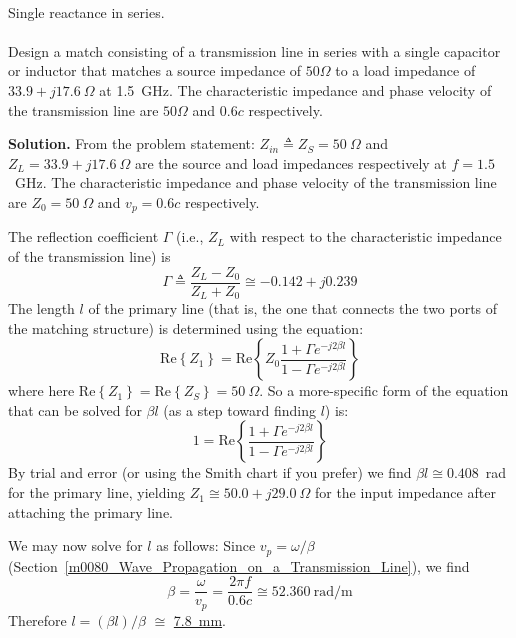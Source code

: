 ~\\ \begin{example} 
\label{m0093_eSSR-S}
\begin{mdframed}[backgroundcolor=brown!20,linecolor=brown!20]\raggedright
Single reactance in series.
\\~\\
Design a match consisting of a transmission line in series with a single capacitor or inductor that matches a source impedance of $50\Omega$ to a load impedance of $33.9 + j17.6~\Omega$ at 1.5~GHz. 
The characteristic impedance and phase velocity of the transmission line are $50\Omega$ and $0.6c$ respectively.

{\bf Solution.}
From the problem statement: 
$Z_{in} \triangleq Z_S = 50~\Omega$ and 
$Z_L = 33.9+j17.6~\Omega$ are the source and load impedances respectively at $f=1.5$~GHz.
The characteristic impedance and phase velocity of the transmission line are $Z_0=50~\Omega$ and $v_p=0.6c$ respectively. 

The reflection coefficient $\Gamma$ (i.e., $Z_L$ with respect to the characteristic impedance of the transmission line) is
%
\begin{equation}
\Gamma \triangleq \frac{Z_L - Z_0}{Z_L + Z_0} \cong -0.142 + j0.239
\end{equation} 
%
The length $l$ of the primary line (that is, the one that connects the two ports of the matching structure) is determined using the equation:
%
\begin{equation}
\mbox{Re}\left\{Z_1\right\} = \mbox{Re}\left\{Z_0 \frac{ 1 + \Gamma e^{-j2\beta l} }{ 1 - \Gamma e^{-j2\beta l} }\right\}
\end{equation}
% 
where here
$\mbox{Re}\left\{Z_1\right\}=\mbox{Re}\left\{Z_S\right\}=50~\Omega$.
So a more-specific form of the equation that can be solved for $\beta l$ (as a step toward finding $l$) is:
%
\begin{equation}
1 = \mbox{Re}\left\{ 
           \frac{ 1+\Gamma e^{-j2\beta l } }
                { 1-\Gamma e^{-j2\beta l } } \right\} 
\end{equation}
%
By trial and error (or using the Smith chart if you prefer) we find $\beta l\cong 0.408$~rad for the primary line, yielding $Z_1 \cong 50.0+j29.0~\Omega$ for the input impedance after attaching the primary line.  

We may now solve for $l$ as follows:
Since $v_p = \omega/\beta$ (Section~\ref{m0080_Wave_Propagation_on_a_Transmission_Line}), we find
%
\begin{equation}
\beta = \frac{\omega}{v_p} = \frac{2\pi f}{0.6 c} \cong 52.360~\mbox{rad/m} 
\end{equation}
%
Therefore $l=\left(\beta l\right)/\beta$ $\cong$ \underline{7.8~mm}.


\end{mdframed}
\end{example}
